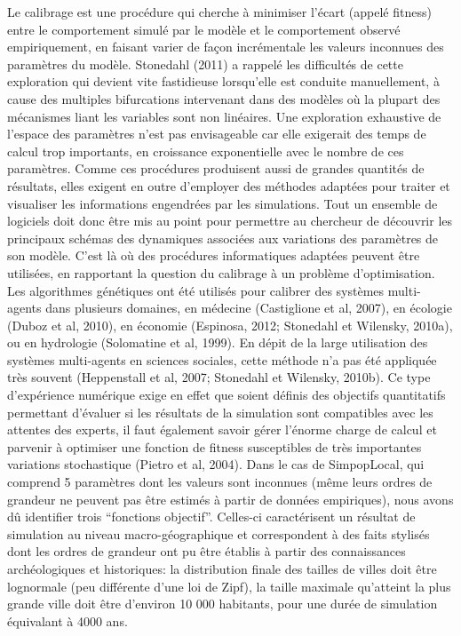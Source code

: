 \documentclass[10pt]{article}
\begin{document}
Le calibrage est une procédure qui cherche à minimiser l’écart (appelé fitness) entre le comportement simulé par le modèle et le comportement observé empiriquement, en faisant varier de façon incrémentale les valeurs inconnues des paramètres du modèle. Stonedahl (2011) a rappelé les difficultés de cette exploration qui devient vite fastidieuse lorsqu’elle est conduite manuellement, à cause des multiples bifurcations intervenant dans des modèles où la plupart des mécanismes liant les variables sont non linéaires. Une exploration exhaustive de l’espace des paramètres n’est pas envisageable car elle exigerait des temps de calcul trop importants, en croissance exponentielle avec le nombre de ces paramètres. Comme ces procédures produisent aussi de grandes quantités de résultats, elles exigent en outre d’employer des méthodes adaptées pour traiter et visualiser les informations engendrées par les simulations. Tout un ensemble de logiciels doit donc être mis au point pour permettre au chercheur de découvrir les principaux schémas des dynamiques associées aux variations des paramètres de son modèle.
C’est là où des procédures informatiques adaptées peuvent être utilisées, en rapportant la question du calibrage à un problème d’optimisation. Les algorithmes génétiques ont été utilisés pour calibrer des systèmes multi-agents dans plusieurs domaines, en médecine (Castiglione et al, 2007), en écologie (Duboz et al, 2010), en économie (Espinosa, 2012; Stonedahl et Wilensky, 2010a), ou en hydrologie (Solomatine et al, 1999). En dépit de la large utilisation des systèmes multi-agents en sciences sociales, cette méthode n’a pas été appliquée très souvent (Heppenstall et al, 2007; Stonedahl et Wilensky, 2010b). Ce type d’expérience numérique exige en effet que soient définis des objectifs quantitatifs permettant d’évaluer si les résultats de la simulation sont compatibles avec les attentes des experts, il faut également savoir gérer l’énorme charge de calcul et parvenir à optimiser une fonction de fitness susceptibles de très importantes variations stochastique (Pietro et al, 2004). 
Dans le cas de SimpopLocal, qui comprend 5 paramètres dont les valeurs sont inconnues (même leurs ordres de grandeur ne peuvent pas être estimés à partir de données empiriques), nous avons dû identifier trois “fonctions objectif”. Celles-ci caractérisent un résultat de simulation au niveau macro-géographique et correspondent à des faits stylisés dont les ordres de grandeur ont pu être établis à partir des connaissances archéologiques et historiques: la distribution finale des tailles de villes doit être lognormale (peu différente d’une loi de Zipf), la taille maximale qu’atteint la plus grande ville doit être d’environ 10 000 habitants, pour une durée de simulation équivalant à 4000 ans.
\end{document}

